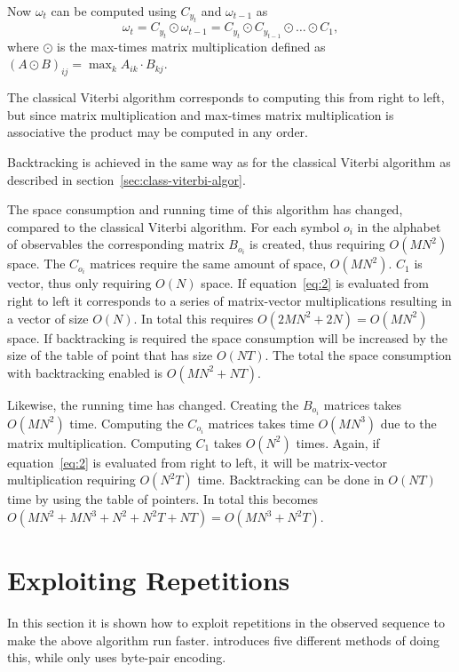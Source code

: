 Now $\omega_t$ can be computed using $C_{y_t}$ and $\omega_{t - 1}$ as
\begin{equation}
  \label{eq:2}
  \omega_t = C_{y_t} \odot \omega_{t - 1} = C_{y_t} \odot C_{y_{t-1}} \odot
  \dots \odot C_1,
\end{equation}
where $\odot$ is the max-times matrix multiplication defined as ${(A \odot
  B)}_{ij} = \max_k A_{ik} \cdot B_{kj}$.

The classical Viterbi algorithm corresponds to computing this from right to
left, but since matrix multiplication and max-times matrix multiplication is
associative the product may be computed in any order.

Backtracking is achieved in the same way as for the classical Viterbi algorithm
as described in section~\ref{sec:class-viterbi-algor}.

The space consumption and running time of this algorithm has changed, compared
to the classical Viterbi algorithm. For each symbol $o_i$ in the alphabet of
observables the corresponding matrix $B_{o_i}$ is created, thus requiring
$O(M N^2)$ space. The $C_{o_i}$ matrices require the same amount of space,
$O(M N^2)$. $C_1$ is vector, thus only requiring $O(N)$ space. If
equation~\eqref{eq:2} is evaluated from right to left it corresponds to a
series of matrix-vector multiplications resulting in a vector of size
$O(N)$. In total this requires $O(2 M N^2 + 2 N) = O(M N^2)$ space. If
backtracking is required the space consumption will be increased by the size of
the table of point that has size $O(N T)$. The total the space consumption with
backtracking enabled is $O(M N^2 + N T)$.

Likewise, the running time has changed. Creating the $B_{o_i}$ matrices takes
$O(M N^2)$ time. Computing the $C_{o_i}$ matrices takes time $O(M N^3)$ due to
the matrix multiplication. Computing $C_1$ takes $O(N^2)$ times. Again, if
equation~\eqref{eq:2} is evaluated from right to left, it will be matrix-vector
multiplication requiring $O(N^2 T)$ time. Backtracking can be done in $O(NT)$
time by using the table of pointers. In total this becomes $O(M N^2 + M N^3 +
N^2 + N^2 T + NT) = O(M N^3 + N^2 T)$.

\section{Exploiting Repetitions}
\label{sec:expl-repet}

In this section it is shown how to exploit repetitions in the observed sequence
to make the above algorithm run faster. \citet{lifshits2009speeding} introduces
five different methods of doing this, while \citet{sand2013ziphmmlib} only uses
byte-pair encoding.

